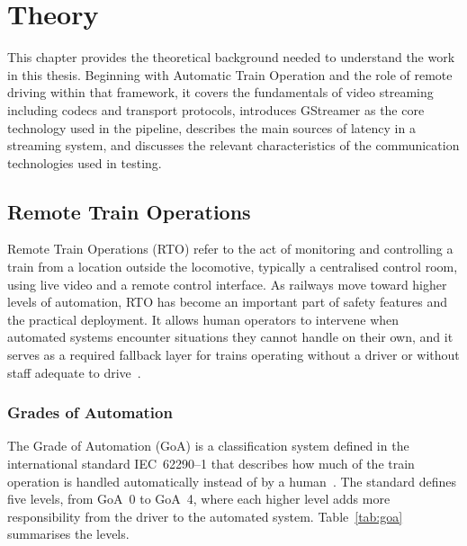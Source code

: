 \section{Theory}
This chapter provides the theoretical background needed to understand the work in this thesis. Beginning with Automatic Train Operation and the role of remote driving within that framework, it covers the fundamentals of video streaming including codecs and transport protocols, introduces GStreamer as the core technology used in the pipeline, describes the main sources of latency in a streaming system, and discusses the relevant characteristics of the communication technologies used in testing.

\vspace{5mm}
\subsection{Remote Train Operations}\label{subsec:rto}
Remote Train Operations (RTO) refer to the act of monitoring and controlling a train from a location outside the locomotive, typically a centralised control room, using live video and a remote control interface. As railways move toward higher levels of automation, RTO has become an important part of safety features and the practical deployment. It allows human operators to intervene when automated systems encounter situations they cannot handle on their own, and it serves as a required fallback layer for trains operating without a driver or without staff adequate to drive~\cite{jurgensen2025, fp2r2dato2023d5_4}.

\subsubsection{Grades of Automation}\label{subsec:goa}
The Grade of Automation (GoA) is a classification system defined in the international standard IEC~62290--1 that describes how much of the train operation is handled automatically instead of by a human~\cite{iec62290}. The standard defines five levels, from GoA~0 to GoA~4, where each higher level adds more responsibility from the driver to the automated system. Table~\ref{tab:goa} summarises the levels.
 
